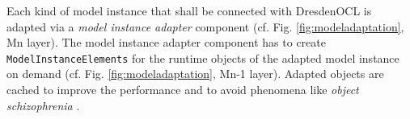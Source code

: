 	Each kind of model instance that shall be connected with DresdenOCL is
	adapted via a \emph{model instance adapter} component (cf. Fig.
	\ref{fig:modeladaptation}, Mn layer). The model instance adapter component has to
	create \texttt{Model\-Instance\-Elements} for the runtime 
	objects of the adapted model instance on demand (cf. Fig. \ref{fig:modeladaptation}, Mn-1 layer). 
	Adapted objects are cached to	improve the performance and to avoid phenomena like \emph{object
	schizophrenia} \cite{szyperski02}.
	


